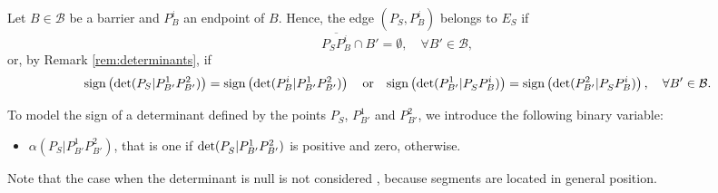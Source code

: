 \documentclass[a4paper]{elsarticle}
\newcommand{\B}{{\mathcal B}}
\newcommand{\ES}{{E^{}_{S}}}
\begin{document}
Let $B\in\B$ be a barrier and $P_B^i$ an endpoint of $B$. Hence, the edge $(P^{}_S, P_B^i)$ belongs to $\ES$ if
$$\overline{P^{}_SP^i_B}\cap B'=\emptyset,\quad \forall B'\in\B,$$
or,
by Remark \ref{rem:determinants}, if
\begin{equation*}
\normalfont{\text{sign}}\left(\determinant{P_S}{P_{B'}^1}{P_{B'}^2}\right) = \normalfont{\text{sign}}\left(\determinant{P_B^i}{P_{B'}^1}{P_{B'}^2}\right)
\quad
\text{or}
\quad
\normalfont{\text{sign}}\left(\determinant{P_{B'}^1}{P_S^{}}{P_B^i}\right) = \normalfont{\text{sign}}\left(\determinant{P_{B'}^2}{P_S^{}}{P_B^i}\right),\quad\forall B'\in\B.
\end{equation*}

\newcommand{\LS}[3]{L(#1|#2#3)}
\newcommand{\US}[3]{U(#1|#2#3)}
\newcommand{\alphamas}[3]{\alpha(#1|#2#3)}
\newcommand{\alphamenos}[3]{\alpha^{-}(#1|#2#3)}
\newcommand{\alphapunto}[3]{\alpha^{\cdotp}(#1|#2#3)}

To model the sign of a determinant defined by the points $P_S^{}$, $P_{B'}^1$ and $P_{B'}^2$, we introduce the following binary variable:
\begin{itemize}
\item $\alphamas{P_S^{}}{P_{B'}^1}{P_{B'}^2}$, that is one if $\det({P_S^{}|P_{B'}^1P_{B'}^2})$ is positive and zero, otherwise.
\end{itemize}
Note that the case when the determinant is null is not considered , because segments are located in general position.
\end{document}
